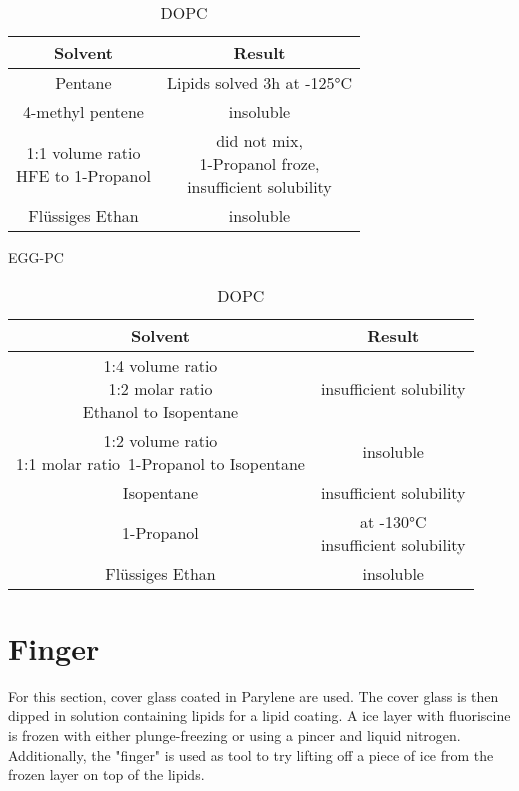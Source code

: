 \begin{table}[h]
	\begin{subtable}{\linewidth}
		\centering
		\begin{tabular}{|c|c|}
		\hline
		Solvent & Result \\
		\hline
		Pentane & Lipids solved 3h at -125°C \\
		\hline
		4-methyl pentene & insoluble \\
		\hline
		\makecell{1:1 volume ratio\\ HFE to 1-Propanol} & \makecell{did not mix,\\ 1-Propanol froze,\\ insufficient solubility}\\
		\hline
		Flüssiges Ethan & insoluble\\
		\hline
		\end{tabular}
		\caption{EGG-PC}
		\label{table:EGG-PCCryoloeslichkeit}
	\end{subtable}
	\begin{subtable}{\linewidth}
		\centering
		\begin{tabular}{|c|c|}
		\hline
		Solvent & Result \\
		\hline
		\makecell{1:4 volume ratio\\ 1:2 molar ratio\\ Ethanol to Isopentane} & insufficient solubility\\
		\hline
		\makecell{1:2 volume ratio\\ 1:1 molar ratio\ 1-Propanol to Isopentane} & insoluble \\
		\hline
		Isopentane & insufficient solubility\\
		\hline
		1-Propanol & \makecell{at -130°C\\ insufficient solubility}\\
		\hline
		Flüssiges Ethan & insoluble \\
		\hline
		\end{tabular}
		\caption{DOPC}
		\label{table:DOPCCryoloeslichkeit}
	\end{subtable}
	\label{table:Cryoloeslichkeit}
\end{table}

\section{Finger}
For this section, cover glass coated in Parylene are used. The cover glass is then dipped in solution containing lipids for a lipid coating. A ice layer with fluoriscine is frozen with either plunge-freezing or using a pincer and liquid nitrogen. Additionally, the "finger" is used as tool to try lifting off a piece of ice from the frozen layer on top of the lipids.

